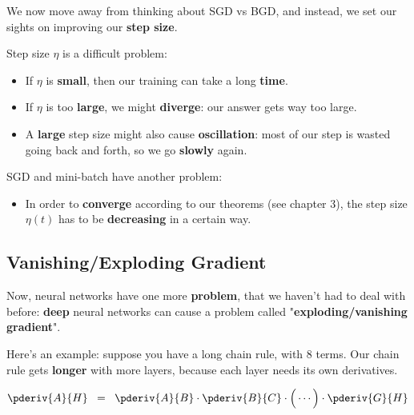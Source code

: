         We now move away from thinking about SGD vs BGD, and instead, we set our sights on improving our \textbf{step size}.
        
        Step size $\eta$ is a difficult problem:
        
        \begin{itemize}
            \item If $\eta$ is \textbf{small}, then our training can take a long \textbf{time}.
            
            \item If $\eta$ is too \textbf{large}, we might \textbf{diverge}: our answer gets way too large.
            
            \item A \textbf{large} step size might also cause \textbf{oscillation}: most of our step is wasted going back and forth, so we go \textbf{slowly} again.
        \end{itemize}
        
        SGD and mini-batch have another problem:
        
        \begin{itemize}
            \item In order to \textbf{converge} according to our theorems (see chapter 3), the step size $\eta(t)$ has to be \textbf{decreasing} in a certain way.
        \end{itemize}
    
    \secdiv
    
    \subsection{Vanishing/Exploding Gradient}
    
        Now, neural networks have one more \textbf{problem}, that we haven't had to deal with before: \textbf{deep} neural networks can cause a problem called "\textbf{exploding/vanishing gradient}".
        
        Here's an example: suppose you have a long chain rule, with 8 terms. Our chain rule gets \textbf{longer} with more layers, because each layer needs its own derivatives.
        
        \begin{equation}
            \pderiv{A}{H}
            \;\;=\;\;
            \pderiv{A}{B}
            \cdot
            \pderiv{B}{C}
            \cdot
            \Big(
            \cdots
            \Big)
            \cdot
            \pderiv{G}{H}
        \end{equation}
        

